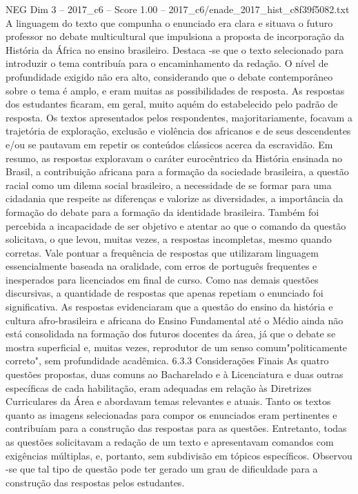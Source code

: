 \begin{textsample}{NEG Dim 3 – 2017\_c6 – Score 1.00 – 2017\_c6/enade\_2017\_hist\_c8f39f5082.txt}
A linguagem do texto que compunha o enunciado era clara e situava o futuro professor no debate multicultural que impulsiona a proposta de incorporação da História da África no ensino brasileiro.
Destaca -se que o texto selecionado para introduzir o tema contribuía para o encaminhamento da redação.
O nível de profundidade exigido não era alto, considerando que o debate contemporâneo sobre o tema é amplo, e eram muitas as possibilidades de resposta.
As respostas dos estudantes ficaram, em geral, muito aquém do estabelecido pelo padrão de resposta.
Os textos apresentados pelos respondentes, majoritariamente, focavam a trajetória de exploração, exclusão e violência dos africanos e de seus descendentes e/ou se pautavam em repetir os conteúdos clássicos acerca da escravidão.
Em resumo, as respostas exploravam o caráter eurocêntrico da História ensinada no Brasil, a contribuição africana para a formação da sociedade brasileira, a questão racial como um dilema social brasileiro, a necessidade de se formar para uma cidadania que respeite as diferenças e valorize as diversidades, a importância da formação do debate para a formação da identidade brasileira.
Também foi percebida a incapacidade de ser objetivo e atentar ao que o comando da questão solicitava, o que levou, muitas vezes, a respostas incompletas, mesmo quando corretas.
Vale pontuar a frequência de respostas que utilizaram linguagem essencialmente baseada na oralidade, com erros de português frequentes e inesperados para licenciados em final de curso.
Como nas demais questões discursivas, a quantidade de respostas que apenas repetiam o enunciado foi significativa.
As respostas evidenciaram que a questão do ensino da história e cultura afro-brasileira e africana do Ensino Fundamental até o Médio ainda não está consolidada na formação dos futuros docentes da área, já que o debate se mostra superficial e, muitas vezes, reprodutor de um senso comum"politicamente correto", sem profundidade acadêmica. 6.3.3 Considerações Finais As quatro questões propostas, duas comuns ao Bacharelado e à Licenciatura e duas outras específicas de cada habilitação, eram adequadas em relação às Diretrizes Curriculares da Área e abordavam temas relevantes e atuais.
Tanto os textos quanto as imagens selecionadas para compor os enunciados eram pertinentes e contribuíam para a construção das respostas para as questões.
Entretanto, todas as questões solicitavam a redação de um texto e apresentavam comandos com exigências múltiplas, e, portanto, sem subdivisão em tópicos específicos.
Observou -se que tal tipo de questão pode ter gerado um grau de dificuldade para a construção das respostas pelos estudantes.

\end{textsample}
